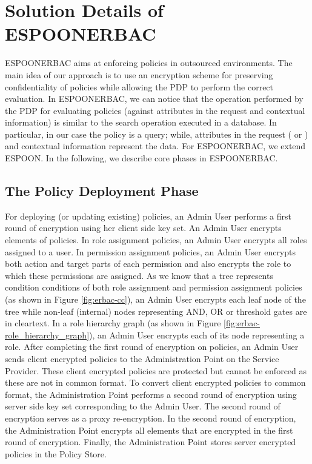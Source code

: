 \documentclass[epsfig,a4paper,11pt,titlepage]{book}
\numberwithin{algorithm}{chapter}
\begin{document}
\section[Solution Details of ESPOON]{Solution Details of \gls{ESPOONERBAC}}
\label{sec:erbac-solution-details}

\gls{ESPOONERBAC} aims at enforcing policies in outsourced environments. The main idea of our approach is to use an encryption scheme for preserving confidentiality of policies while allowing the \gls{PDP} to perform the correct evaluation. In \gls{ESPOONERBAC}, we can notice that the operation performed by the \gls{PDP} for evaluating policies (against attributes in the request and contextual information) is similar to the search operation executed in a database. In particular, in our case the policy is a query; while, attributes in the request ( or ) and contextual information represent the data. For \gls{ESPOONERBAC}, we extend \gls{ESPOON}. In the following, we describe core phases in \gls{ESPOONERBAC}.

\subsection{The Policy Deployment Phase}

For deploying (or updating existing) policies, an Admin User performs a first round of encryption using her client side key set. An Admin User encrypts elements of policies. In role assignment policies, an Admin User encrypts all roles assigned to a user. In permission assignment policies, an Admin User encrypts both action and target parts of each permission and also encrypts the role to which these permissions are assigned. As we know that a tree represents condition conditions of both role assignment and permission assignment policies (as shown in Figure \ref{fig:erbac-cc}), an Admin User encrypts each leaf node of the tree while non-leaf (internal) nodes representing AND, OR or threshold gates are in cleartext. In a role hierarchy graph (as shown in Figure \ref{fig:erbac-role_hierarchy_graph}), an Admin User encrypts each of its node representing a role. After completing the first round of encryption on policies, an Admin User sends client encrypted policies to the Administration Point on the Service Provider. These client encrypted policies are protected but cannot be enforced as these are not in common format. To convert client encrypted policies to common format, the Administration Point performs a second round of encryption using server side key set corresponding to the Admin User. The second round of encryption serves as a proxy re-encryption. In the second round of encryption, the Administration Point encrypts all elements that are encrypted in the first round of encryption. Finally, the Administration Point stores server encrypted policies in the Policy Store.
\end{document}
